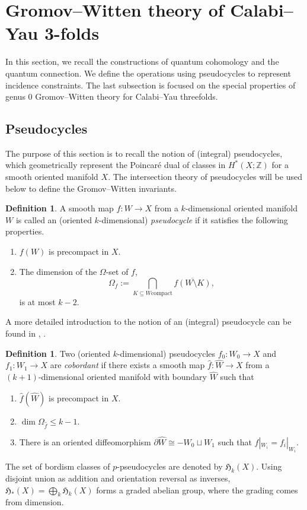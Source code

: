 \documentclass[reqno]{amsart}
\numberwithin{equation}{section}
\numberwithin{equation}{section}
\numberwithin{equation}{section}
\theoremstyle{definition}
\newtheorem{defn}[thm]{Definition}
\theoremstyle{remark}
\theoremstyle{remark}
\newcommand{\ov}{\overline}
\begin{document}
\section{Gromov--Witten theory of Calabi--Yau 3-folds}

In this section, we recall the constructions of quantum cohomology and the quantum connection. We define the operations using pseudocycles to represent incidence constraints. The last subsection is focused on the special properties of genus $0$ Gromov--Witten theory for Calabi--Yau threefolds.

\subsection{Pseudocycles}\label{ssec:pseudocycles}
The purpose of this section is to recall the notion of (integral) pseudocycles, which geometrically represent the Poincar\'e dual of classes in $H^*(X;\mathbb{Z})$ for a smooth oriented manifold $X$. The intersection theory of pseudocycles will be used below to define the Gromov--Witten invariants.
\begin{defn}
    A smooth map $f: W \to X$ from a $k$-dimensional oriented manifold $W$ is called an (oriented $k$-dimensional) \emph{pseudocycle} if it satisfies the following properties.
    \begin{enumerate}
        \item $f(W)$ is precompact in $X$.
        \item The dimension of the $\Omega$-set of $f$,
        \begin{equation}
            \Omega_f := \bigcap_{K \subseteq W \mathrm{compact}} \ov{f(W\setminus K)},
        \end{equation}
        is at most $k-2$.
    \end{enumerate}
\end{defn}
A more detailed introduction to the notion of an (integral) pseudocycle can be found in \cite[Section 6.5]{MS12}, \cite{Zin08}.

\begin{defn}
    Two (oriented $k$-dimensional) pseudocycles $f_0: W_0 \to X$ and $f_1 : W_1 \to X$ are \emph{cobordant} if there exists a smooth map $\hat{f}: \hat{W} \to X$ from a $(k+1)$-dimensional oriented manifold with boundary $\hat{W}$ such that
    \begin{enumerate}
        \item $\hat{f}(\hat{W})$ is precompact in $X$.
        \item $\dim \Omega_{\hat{f}} \le k-1$.
        \item There is an oriented diffeomorphism $\partial \hat{W} \cong - W_0 \sqcup W_1$ such that $\hat{f}|_{W_i} = f_i |_{W_i}$.
    \end{enumerate}
\end{defn}
The set of bordism classes of $p$-pseudocycles are denoted by $\mathfrak{H}_k(X)$. Using disjoint union as addition and orientation reversal as inverses, $\mathfrak{H}_*(X) = \bigoplus_k \mathfrak{H}_k(X)$ forms a graded abelian group, where the grading comes from dimension.
\end{document}

